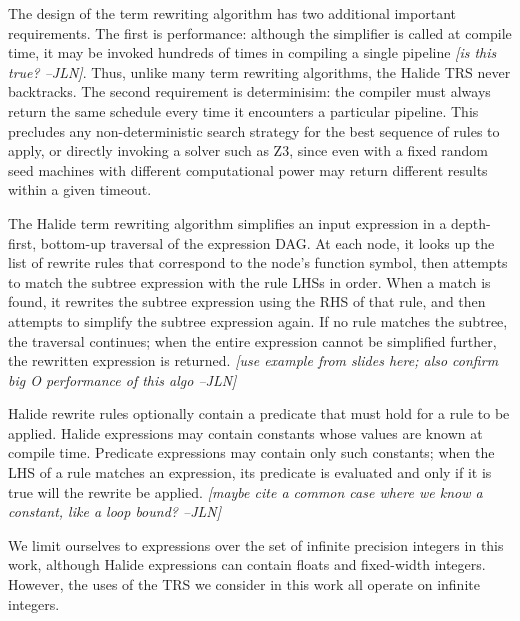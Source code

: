 \documentclass[sigplan,review,anonymous]{acmart}\settopmatter{printfolios=true,printccs=false,printacmref=false}
\newcommand{\jln}[1]{\textcolor{uwpurple}{\textit{[{#1} --JLN]}}}
\begin{document}

The design of the term rewriting algorithm has two additional important
requirements. The first is performance: although the simplifier is called at
compile time, it may be invoked hundreds of times in compiling a single pipeline
\jln{is this true?}. Thus, unlike many term rewriting algorithms, the Halide TRS
never backtracks. The second requirement is determinisim: the compiler must
always return the same schedule every time it encounters a particular pipeline.
This precludes any non-deterministic search strategy for the best sequence of
rules to apply, or directly invoking a solver such as Z3, since even with a
fixed random seed machines with different computational power may return
different results within a given timeout.

The Halide term rewriting algorithm simplifies an input expression in a depth-first, bottom-up traversal of the expression DAG. At each node, it looks up the list of rewrite rules that correspond to the node's function symbol, then attempts to match the subtree expression with the rule LHSs in order. When a match is found, it rewrites the subtree expression using the RHS of that rule, and then attempts to simplify the subtree expression again. If no rule matches the subtree, the traversal continues; when the entire expression cannot be simplified further, the rewritten expression is returned. \jln{use example from slides here; also confirm big O performance of this algo}

Halide rewrite rules optionally contain a predicate that must hold for a rule to be applied. Halide expressions may contain constants whose values are known at compile time. Predicate expressions may contain only such constants; when the LHS of a rule matches an expression, its predicate is evaluated and only if it is true will the rewrite be applied. \jln{maybe cite a common case where we know a constant, like a loop bound?}

We limit ourselves to expressions over the set of infinite precision integers in
this work, although Halide expressions can contain floats and fixed-width
integers. However, the uses of the TRS we consider in this work all operate
on infinite integers.
\end{document}
